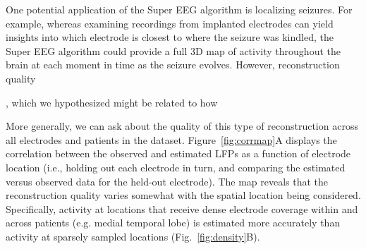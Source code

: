 







One potential application of the Super EEG algorithm is localizing
seizures.  For example, whereas examining recordings from implanted
electrodes can yield insights into which electrode is closest to where
the seizure was kindled, the Super EEG algorithm could provide a full 3D
map of activity throughout the brain at each moment in time as the
seizure evolves.  However, reconstruction quality



, which we hypothesized might be
related to how

More generally, we can ask about the quality of this type of
reconstruction across all electrodes and patients in the dataset.
Figure~\ref{fig:corrmap}A displays the correlation between the
observed and estimated LFPs as a function of electrode location (i.e.,
holding out each electrode in turn, and comparing the estimated versus
observed data for the held-out electrode).  The map
reveals that the reconstruction quality varies somewhat with the spatial
location being considered.  Specifically, activity at locations that
receive dense electrode coverage within and across patients
(e.g. medial temporal lobe) is estimated more accurately than activity
at sparsely sampled locations (Fig.~\ref{fig:density}B).
